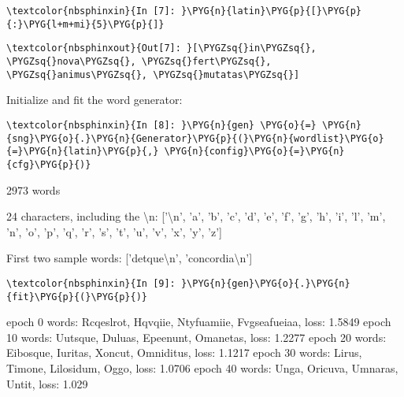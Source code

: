 \documentclass[letterpaper,10pt,english]{sphinxmanual}
\begin{document}
%
\begin{Verbatim}[commandchars=\\\{\}]
\textcolor{nbsphinxin}{In [7]: }\PYG{n}{latin}\PYG{p}{[}\PYG{p}{:}\PYG{l+m+mi}{5}\PYG{p}{]}
\end{Verbatim}

%
\begin{Verbatim}[commandchars=\\\{\}]
\textcolor{nbsphinxout}{Out[7]: }[\PYGZsq{}in\PYGZsq{}, \PYGZsq{}nova\PYGZsq{}, \PYGZsq{}fert\PYGZsq{}, \PYGZsq{}animus\PYGZsq{}, \PYGZsq{}mutatas\PYGZsq{}]
\end{Verbatim}

Initialize and fit the word generator:

%
\begin{Verbatim}[commandchars=\\\{\}]
\textcolor{nbsphinxin}{In [8]: }\PYG{n}{gen} \PYG{o}{=} \PYG{n}{sng}\PYG{o}{.}\PYG{n}{Generator}\PYG{p}{(}\PYG{n}{wordlist}\PYG{o}{=}\PYG{n}{latin}\PYG{p}{,} \PYG{n}{config}\PYG{o}{=}\PYG{n}{cfg}\PYG{p}{)}
\end{Verbatim}



%
\begin{OriginalVerbatim}[commandchars=\\\{\}]
2973 words

24 characters, including the \textbackslash{}n:
['\textbackslash{}n', 'a', 'b', 'c', 'd', 'e', 'f', 'g', 'h', 'i', 'l', 'm', 'n', 'o', 'p', 'q', 'r', 's', 't', 'u', 'v', 'x', 'y', 'z']

First two sample words:
['detque\textbackslash{}n', 'concordia\textbackslash{}n']
\end{OriginalVerbatim}
\relax

%
\begin{Verbatim}[commandchars=\\\{\}]
\textcolor{nbsphinxin}{In [9]: }\PYG{n}{gen}\PYG{o}{.}\PYG{n}{fit}\PYG{p}{(}\PYG{p}{)}
\end{Verbatim}



%
\begin{OriginalVerbatim}[commandchars=\\\{\}]
epoch 0 words: Rcqeslrot, Hqvqiie, Ntyfuamiie, Fvgseafueiaa, loss: 1.5849
epoch 10 words: Uutsque, Duluas, Epeenunt, Omanetas, loss: 1.2277
epoch 20 words: Eibosque, Iuritas, Xoncut, Omniditus, loss: 1.1217
epoch 30 words: Lirus, Timone, Lilosidum, Oggo, loss: 1.0706
epoch 40 words: Unga, Oricuva, Umnaras, Untit, loss: 1.029
\end{OriginalVerbatim}
\relax
\end{document}
